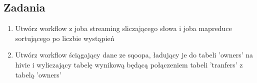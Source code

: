 \documentclass[11pt]{article}
\begin{document}
\pagebreak
\subsection*{Zadania}
\begin{enumerate}
\item Utwórz workflow z joba streaming sliczającego słowa i joba mapreduce sortującego po liczbie wystąpień
\item Utwórz workflow ściągający dane ze sqoopa, ładujący je do tabeli 'owners' na hivie i wyliczający tabelę wynikową będącą połączeniem tabeli 'tranfers' z tabelą 'owners'
\end{enumerate}
\end{document}
